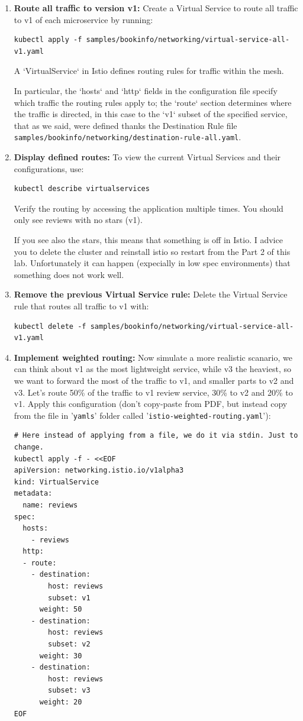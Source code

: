 \documentclass{article}
\begin{document}
\begin{enumerate}
    \item \textbf{Route all traffic to version v1:} 
    Create a Virtual Service to route all traffic to v1 of each microservice by running:
    \begin{lstlisting}
kubectl apply -f samples/bookinfo/networking/virtual-service-all-v1.yaml
    \end{lstlisting}
    A `VirtualService` in Istio defines routing rules for traffic within the mesh. 
    
    In particular, the `hosts` and `http` fields in the configuration file specify which traffic the routing rules apply to; the `route` section determines where the traffic is directed, in this case to the `v1` subset of the specified service, that as we said, were defined thanks the Destination Rule file \texttt{samples/bookinfo/networking/destination-rule-all.yaml}.

    \item \textbf{Display defined routes:} 
    To view the current Virtual Services and their configurations, use:
    \begin{lstlisting}
kubectl describe virtualservices
    \end{lstlisting}
    Verify the routing by accessing the application multiple times. You should only see reviews with no stars (v1).

    If you see also the stars, this means that something is off in Istio. I advice you to delete the cluster and reinstall istio so restart from the Part 2 of this lab. Unfortunately it can happen (expecially in low spec environments) that something does not work well.

    \item \textbf{Remove the previous Virtual Service rule:} 
    Delete the Virtual Service rule that routes all traffic to v1 with:
    \begin{lstlisting}
kubectl delete -f samples/bookinfo/networking/virtual-service-all-v1.yaml
    \end{lstlisting}

    \item \textbf{Implement weighted routing:} 
    Now simulate a more realistic scanario, we can think about v1 as the most lightweight service, while v3 the heaviest, so we want to forward the most of the traffic to v1, and smaller parts to v2 and v3. Let's route 50\% of the traffic to v1 review service, 30\% to v2 and 20\% to v1. Apply this configuration (don't copy-paste from PDF, but instead copy from the file in '\texttt{yamls}' folder called '\texttt{istio-weighted-routing.yaml}'):
    \begin{lstlisting}
# Here instead of applying from a file, we do it via stdin. Just to change.
kubectl apply -f - <<EOF
apiVersion: networking.istio.io/v1alpha3
kind: VirtualService
metadata:
  name: reviews
spec:
  hosts:
    - reviews
  http:
  - route:
    - destination:
        host: reviews
        subset: v1
      weight: 50
    - destination:
        host: reviews
        subset: v2
      weight: 30
    - destination:
        host: reviews
        subset: v3
      weight: 20
EOF
    \end{lstlisting}


\end{enumerate}
\end{document}
